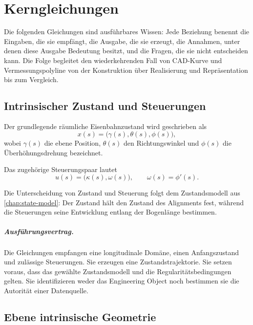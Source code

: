 
\chapter{Kerngleichungen}
\label{chap:core-equations}

Die folgenden Gleichungen sind ausführbares Wissen: Jede Beziehung benennt die
Eingaben, die sie empfängt, die Ausgabe, die sie erzeugt, die Annahmen, unter
denen diese Ausgabe Bedeutung besitzt, und die Fragen, die sie nicht
entscheiden kann. Die Folge begleitet den wiederkehrenden Fall von CAD-Kurve
und Vermessungspolyline von der Konstruktion über Realisierung und
Repräsentation bis zum Vergleich.

\section{Intrinsischer Zustand und Steuerungen}

Der grundlegende räumliche Eisenbahnzustand wird geschrieben als
\begin{equation}
x(s)
=
\bigl(\gamma(s),\theta(s),\phi(s)\bigr),
\label{eq:canonical-state}
\end{equation}
wobei \(\gamma(s)\) die ebene Position, \(\theta(s)\) den Richtungswinkel und
\(\phi(s)\) die Überhöhungsdrehung bezeichnet.

Das zugehörige Steuerungspaar lautet
\begin{equation}
u(s)
=
\bigl(\kappa(s),\omega(s)\bigr),
\qquad
\omega(s)=\phi'(s).
\label{eq:control-variables}
\end{equation}

Die Unterscheidung von Zustand und Steuerung folgt dem Zustandsmodell aus
\cref{chap:state-model}: Der Zustand hält den Zustand des Alignments fest,
während die Steuerungen seine Entwicklung entlang der Bogenlänge bestimmen.

\paragraph{Ausführungsvertrag.}
Die Gleichungen empfangen eine longitudinale Domäne, einen Anfangszustand und
zulässige Steuerungen. Sie erzeugen eine Zustandstrajektorie. Sie setzen
voraus, dass das gewählte Zustandsmodell und die Regularitätsbedingungen
gelten. Sie identifizieren weder das Engineering Object noch bestimmen sie die
Autorität einer Datenquelle.

\section{Ebene intrinsische Geometrie}

